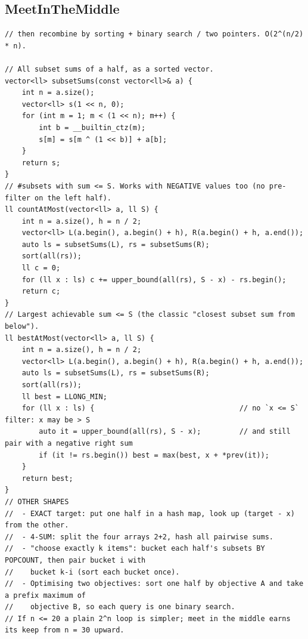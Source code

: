 \documentclass[9pt,a4paper,twocolumn]{extarticle}
\begin{document}
\filbreak
\subsection{MeetInTheMiddle}
\nopagebreak
\begin{lstlisting}
// then recombine by sorting + binary search / two pointers. O(2^(n/2) * n).

// All subset sums of a half, as a sorted vector.
vector<ll> subsetSums(const vector<ll>& a) {
    int n = a.size();
    vector<ll> s(1 << n, 0);
    for (int m = 1; m < (1 << n); m++) {
        int b = __builtin_ctz(m);
        s[m] = s[m ^ (1 << b)] + a[b];
    }
    return s;
}
// #subsets with sum <= S. Works with NEGATIVE values too (no pre-filter on the left half).
ll countAtMost(vector<ll> a, ll S) {
    int n = a.size(), h = n / 2;
    vector<ll> L(a.begin(), a.begin() + h), R(a.begin() + h, a.end());
    auto ls = subsetSums(L), rs = subsetSums(R);
    sort(all(rs));
    ll c = 0;
    for (ll x : ls) c += upper_bound(all(rs), S - x) - rs.begin();
    return c;
}
// Largest achievable sum <= S (the classic "closest subset sum from below").
ll bestAtMost(vector<ll> a, ll S) {
    int n = a.size(), h = n / 2;
    vector<ll> L(a.begin(), a.begin() + h), R(a.begin() + h, a.end());
    auto ls = subsetSums(L), rs = subsetSums(R);
    sort(all(rs));
    ll best = LLONG_MIN;
    for (ll x : ls) {                                  // no `x <= S` filter: x may be > S
        auto it = upper_bound(all(rs), S - x);         // and still pair with a negative right sum
        if (it != rs.begin()) best = max(best, x + *prev(it));
    }
    return best;
}
// OTHER SHAPES
//  - EXACT target: put one half in a hash map, look up (target - x) from the other.
//  - 4-SUM: split the four arrays 2+2, hash all pairwise sums.
//  - "choose exactly k items": bucket each half's subsets BY POPCOUNT, then pair bucket i with
//    bucket k-i (sort each bucket once).
//  - Optimising two objectives: sort one half by objective A and take a prefix maximum of
//    objective B, so each query is one binary search.
// If n <= 20 a plain 2^n loop is simpler; meet in the middle earns its keep from n = 30 upward.
\end{lstlisting}

\filbreak
\end{document}
